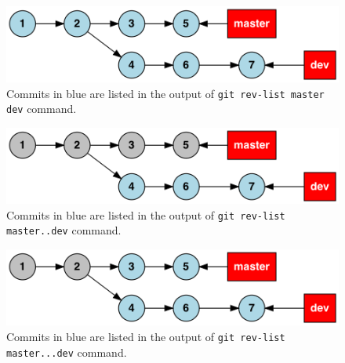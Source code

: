 \documentclass[11pt]{article}
\begin{document}
\begin{figure}[htb]
\centering
\includegraphics[width=.9\linewidth]{./images/commit-ranges-AB.png}
\caption{\label{fig:orgparagraph2}
Commits in blue are listed in the output of \texttt{git rev-list master dev} command.}
\end{figure}
\begin{figure}[htb]
\centering
\includegraphics[width=.9\linewidth]{./images/commit-ranges-A__B.png}
\caption{\label{fig:orgparagraph3}
Commits in blue are listed in the output of \texttt{git rev-list master..dev} command.}
\end{figure}
\begin{figure}[htb]
\centering
\includegraphics[width=.9\linewidth]{./images/commit-ranges-A___B.png}
\caption{\label{fig:orgparagraph4}
Commits in blue are listed in the output of \texttt{git rev-list master...dev} command.}
\end{figure}
\end{document}
